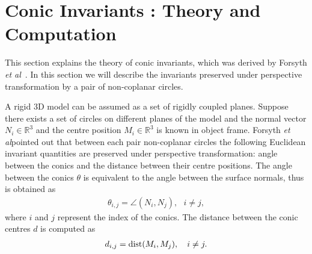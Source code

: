 \documentclass{bmvc2k}
\newcommand{\revise}[2]{\textcolor{red}{\sout{#1}} \textcolor{blue}{#2}}  %
\def\etal{\emph{et al}\bmvaOneDot}
\begin{document}
\section{Conic Invariants : Theory and Computation}
\label{Sec:ConicInv}
This section explains the theory of conic invariants, which was derived by Forsyth \etal~\cite{forsyth_91}. In this section we will describe the invariants preserved under perspective transformation by a pair of non-coplanar circles. 

A rigid 3D model can be assumed as a set of rigidly coupled planes. Suppose there exists a set of circles on different planes of the model and the normal vector $N_i \in \mathbb{R}^3$ and the centre position $M_i \in \mathbb{R}^3$ is known in object frame.
Forsyth \etal pointed out that between each pair non-coplanar circles the following Euclidean invariant quantities are preserved under perspective transformation: angle between the conics and the distance between their centre positions.
The angle between the conics $\theta$ is equivalent to the angle between the surface normals, thus is obtained as
\begin{align}
\theta_{i,j} = \angle(N_i,N_j),~~~i \neq j,
\label{eq:invTheta3d}
\end{align}
where $i$ and $j$ represent the index of the conics.
The distance between the conic centres $d$ is computed as
\begin{align}
d_{i,j} = {\rm dist}(M_i,M_j),~~~i \neq j.
\label{eq:invD3d}
\end{align} 
\end{document}

